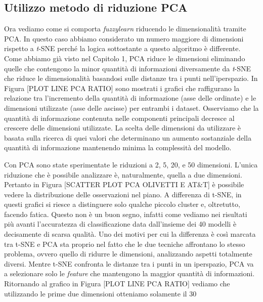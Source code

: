 \documentclass[12pt,italian]{report}
\begin{document}
\subsection{Utilizzo metodo di riduzione PCA}
Ora vediamo come si comporta \emph{fuzzylearn} riducendo le dimensionalità tramite PCA. In questo caso abbiamo considerato un numero maggiore di dimensioni rispetto a \emph{t}-SNE perché la logica sottostante a questo algoritmo è differente. Come abbiamo già visto nel Capitolo 1, PCA riduce le dimensioni eliminando quelle che contengono la minor quantità di informazioni diversamente da \emph{t}-SNE che riduce le dimensionalità basandosi sulle distanze tra i punti nell'iperspazio. In Figura [PLOT LINE PCA RATIO] sono mostrati i grafici che raffigurano la relazione tra l'incremento della quantità di informazione (asse delle ordinate) e le dimensioni utilizzate (asse delle ascisse) per entrambi i dataset. Osserviamo che la quantità di informazione contenuta nelle componenti principali decresce al crescere delle dimensioni utilizzate. La scelta delle dimensioni da utilizzare è basata sulla ricerca di quei valori che determinano un aumento sostanziale della quantità di informazione mantenendo minima la complessità del modello.


Con PCA sono state sperimentate le riduzioni a 2, 5, 20, e 50 dimensioni. L'unica riduzione che è possibile analizzare è, naturalmente, quella a due dimensioni. Pertanto in Figura [SCATTER PLOT PCA OLIVETTI E AT\&T] è possibile vedere la distribuzione delle osservazioni nel piano. A differenza di t-SNE, in questi grafici si riesce a distinguere solo qualche piccolo cluster e, oltretutto, facendo fatica. Questo non è un buon segno, infatti come vediamo nei risultati più avanti l'accuratezza di classificazione data dall'insieme dei 40 modelli è decisamente di scarsa qualità. Uno dei motivi per cui la differenza è così marcata tra t-SNE e PCA sta proprio nel fatto che le due tecniche affrontano lo stesso problema, ovvero quello di ridurre le dimensioni, analizzando aspetti totalmente diversi. Mentre t-SNE confronta le distanze tra i punti in un iperspazio, PCA va a selezionare solo le \emph{feature} che mantengono la maggior quantità di informazioni. Ritornando al grafico in Figura [PLOT LINE PCA RATIO] vediamo che utilizzando le prime due dimensioni otteniamo solamente il 30%
\end{document}
